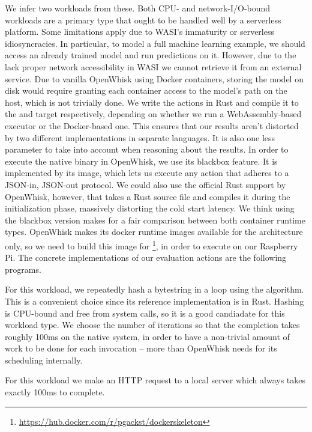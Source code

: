 We infer two workloads from these. Both CPU- and network-I/O-bound workloads are a primary type that ought to be handled well by a serverless platform. Some limitations apply due to WASI's immaturity or serverless idiosyncracies. In particular, to model a full machine learning example, we should access an already trained model and run predictions on it. However, due to the lack proper network accessibility in WASI we cannot retrieve it from an external service. Due to vanilla OpenWhisk using Docker containers, storing the model on disk would require granting each container access to the model's path on the host, which is not trivially done. We write the actions in Rust and compile it to the  and  target respectively, depending on whether we run a WebAssembly-based executor or the Docker-based one. This ensures that our results aren't distorted by two different implementations in separate languages. It is also one less parameter to take into account when reasoning about the results. In order to execute the native binary in OpenWhisk, we use its blackbox feature. It is implemented by its  image, which lets us execute any action that adheres to a JSON-in, JSON-out protocol. We could also use the official Rust support by OpenWhisk, however, that takes a Rust source file and compiles it during the initialization phase, massively distorting the cold start latency. We think using the blackbox version makes for a fair comparison between both container runtime types.
OpenWhisk makes its docker runtime images available for the  architecture only, so we need to build this image for \footnote{\url{https://hub.docker.com/r/pgackst/dockerskeleton}}, in order to execute on our Raspberry Pi. The concrete implementations of our evaluation actions are the following programs.

\begin{description}[style=multiline, leftmargin=2.5cm, font=\bfseries]
    \item[CPU-bound] For this workload, we repeatedly hash a bytestring in a loop using the  algorithm. This is a convenient choice since its reference implementation is in Rust. Hashing is CPU-bound and free from system calls, so it is a good candiadate for this workload type. We choose the number of iterations so that the completion takes roughly 100ms on the native system, in order to have a non-trivial amount of work to be done for each invocation -- more than OpenWhisk needs for its scheduling internally.
    \item[Network-I/O-bound] For this workload we make an HTTP request to a local server which always takes exactly 100ms to complete.
\end{description}


